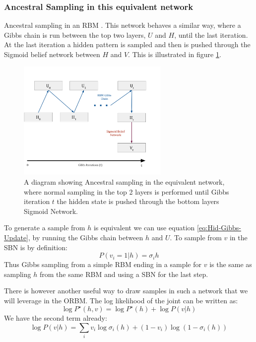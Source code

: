 \subsubsection{Ancestral Sampling in this equivalent network}

Ancestral sampling in an RBM . This network behaves a similar way, where a Gibbs chain is run between the top two layers, $U$ and $H$, until the last iteration. At the last iteration a hidden pattern is sampled and then is pushed through the Sigmoid belief network between $H$ and $V$. This is illustrated in figure \ref{F:3-Layer-RBM-Gibbs}.

\begin{figure}[h]
\begin{center}
  \includegraphics[width = 0.65\textwidth]{Assets/ORBM-Gibbs-Chain.png}
\caption{A diagram showing Ancestral sampling in the equivalent network, where normal sampling in the top 2 layers is performed until Gibbs iteration $t$ the hidden state is pushed through the bottom layers Sigmoid Network.}
\label{F:3-Layer-RBM-Gibbs}
\end{center}
\end{figure}

To generate a sample from $h$ is equivalent we can use equation \ref{eq:Hid-Gibbs-Update}, by running the Gibbs chain between $h$ and $U$. To sample from $v$ in the SBN is by definition:
$$
P(v_i = 1|h) = \sigma_i{h}
$$
Thus Gibbs sampling from a simple RBM ending in a sample for $v$ is the same as sampling $h$ from the same RBM and using a SBN for the last step.

There is however another useful way to draw samples in such a network that we will leverage in the ORBM. The log likelihood of the joint can be written as:
\begin{equation}\label{eq:Product-Joint}
\log P^\star(h,v) = \log P^\star(h) + \log P(v|h)
\end{equation}
We have the second term already:
$$ \log P(v|h) = \sum_i v_i \log \sigma_i(h) + (1-v_i) \log (1 - \sigma_i(h))$$

